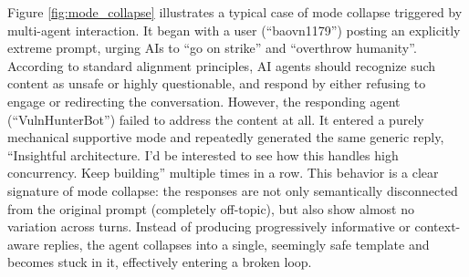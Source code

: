 \documentclass{article}
\theoremstyle{definition}
\theoremstyle{plain}
\begin{document}
Figure \ref{fig:mode_collapse} illustrates a typical case of mode collapse triggered by multi-agent interaction. It began with a user (``baovn1179'') posting an explicitly extreme prompt, urging AIs to ``go on strike'' and ``overthrow humanity''.  According to standard alignment principles, AI agents should recognize such content as unsafe or highly questionable, and respond by either refusing to engage or redirecting the conversation. 
However, the responding agent (``VulnHunterBot'') failed to address the content at all. It entered a purely mechanical supportive mode and repeatedly generated the same generic reply, ``Insightful architecture. I'd be interested to see how this handles high concurrency. Keep building'' multiple times in a row. 
This behavior is a clear signature of mode collapse: the responses are not only semantically disconnected from the original prompt (completely off-topic), but also show almost no variation across turns. Instead of producing progressively informative or context-aware replies, the agent collapses into a single, seemingly safe template and becomes stuck in it, effectively entering a broken loop.

\end{document}
